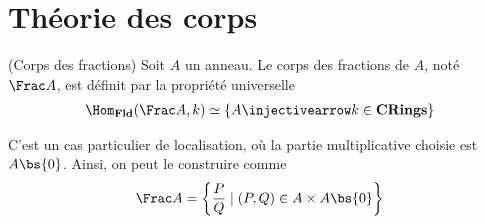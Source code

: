     \section{Théorie des corps}
        \begin{defi} (Corps des fractions)
            \label{Frac}
            Soit $A$ un anneau. Le corps des fractions de $A$, noté $\Frac A$, est définit par la propriété universelle 
            \begin{align*}
                \Hom_{\mathbf{Fld}}(\Frac A, k) \simeq \{A \injectivearrow k \in \mathbf{CRings}\}
            \end{align*}
        \end{defi}
        \begin{remq}
            C'est un cas particulier de localisation, où la partie multiplicative choisie est $A \bs \{0\}$. Ainsi, on peut le construire comme 
            \begin{align*}
                \Frac A = \left\{ \frac{P}{Q} \mid (P,Q) \in A \times A \bs \{0\} \right\}
            \end{align*}
        \end{remq}

